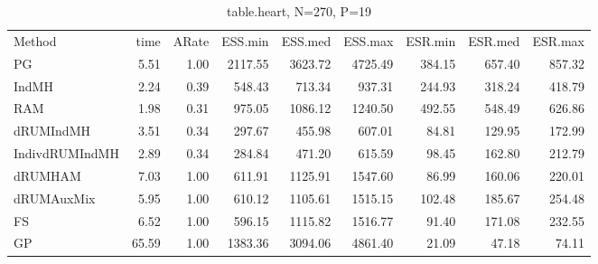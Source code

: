 \begin{table}
\begin{tabular}{l r r r r r r r r } 
          Method  &     time &    ARate &  ESS.min &  ESS.med &  ESS.max &  ESR.min &  ESR.med &  ESR.max \\ 
              PG  &     5.51 &     1.00 &  2117.55 &  3623.72 &  4725.49 &   384.15 &   657.40 &   857.32 \\ 
           IndMH  &     2.24 &     0.39 &   548.43 &   713.34 &   937.31 &   244.93 &   318.24 &   418.79 \\ 
             RAM  &     1.98 &     0.31 &   975.05 &  1086.12 &  1240.50 &   492.55 &   548.49 &   626.86 \\ 
       dRUMIndMH  &     3.51 &     0.34 &   297.67 &   455.98 &   607.01 &    84.81 &   129.95 &   172.99 \\ 
  IndivdRUMIndMH  &     2.89 &     0.34 &   284.84 &   471.20 &   615.59 &    98.45 &   162.80 &   212.79 \\ 
         dRUMHAM  &     7.03 &     1.00 &   611.91 &  1125.91 &  1547.60 &    86.99 &   160.06 &   220.01 \\ 
      dRUMAuxMix  &     5.95 &     1.00 &   610.12 &  1105.61 &  1515.15 &   102.48 &   185.67 &   254.48 \\ 
              FS  &     6.52 &     1.00 &   596.15 &  1115.82 &  1516.77 &    91.40 &   171.08 &   232.55 \\ 
              GP  &    65.59 &     1.00 &  1383.36 &  3094.06 &  4861.40 &    21.09 &    47.18 &    74.11
 \end{tabular}
\caption{table.heart, N=270, P=19}
\end{table}

